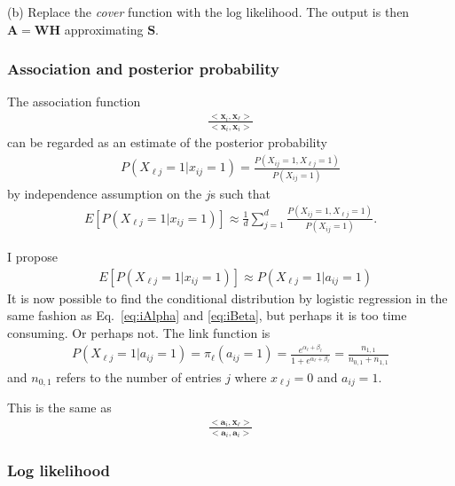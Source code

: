 \documentclass[12pt]{article}
\begin{document}
(b) Replace the {\it cover} function with the log likelihood. The output is then $\mathbf{A} = \mathbf{WH}$ approximating $\mathbf{S}$.

\subsubsection*{Association and posterior probability} %

The association function 
\begin{align}
 \frac{<\mathbf{x}_i,\mathbf{x}_{\ell}>}{<\mathbf{x}_{i},\mathbf{x}_{i}>}
\end{align}
can be regarded as an estimate of the posterior probability
\begin{align}
  P(X_{\ell j} = 1 | x_{i j} = 1) = \frac{P(X_{i j} = 1, X_{\ell j} = 1)}{P( X_{i j} = 1)}
\end{align}
by independence assumption on the $j$s such that 
\begin{align}
  E [ P(X_{\ell j} = 1 | x_{i j} = 1)] \approx  \frac{1}{d} \sum_{j = 1}^ d \frac{P(X_{i j} = 1, X_{\ell j} = 1)}{P( X_{i j} = 1)}.
\end{align}

I propose
\begin{align}
&   E [ P(X_{\ell j} = 1 | x_{i j} = 1)] \approx  P(X_{\ell j} = 1 | a_{i j} = 1)
\end{align}
It is now possible to find the conditional distribution by logistic regression in the same fashion as Eq.~\ref{eq:iAlpha} and \ref{eq:iBeta}, but perhaps it is too time consuming. 
Or perhaps not.
The link function is
\begin{align}
   P(X_{\ell j} = 1 | a_{i j} = 1) =  \pi_\ell(a_{ij}= 1) = \frac{e^{\alpha_{\ell} + \beta_{\ell}}}{1 + e^{\alpha_{\ell} + \beta_{\ell}}} = \frac{n_{1,1}}{n_{0,1} + n_{1,1}}
\end{align}
and $n_{0,1}$ refers to the number of entries $j$ where $x_{\ell j} = 0$ and $a_{ij} = 1$. 

This is the same as
\begin{align}
  \frac{<\mathbf{a}_i,\mathbf{x}_{\ell}>}{<\mathbf{a}_{i},\mathbf{a}_{i}>}
\end{align}

\subsubsection*{Log likelihood} %
\end{document}
